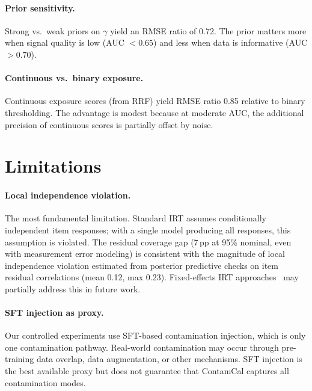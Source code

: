 \documentclass[letterpaper]{article}
\begin{document}
\paragraph{Prior sensitivity.}
Strong vs.\ weak priors on $\gamma$ yield an RMSE ratio of 0.72.
The prior matters more when signal quality is low (AUC $< 0.65$) and less when data is informative (AUC $> 0.70$).

\paragraph{Continuous vs.\ binary exposure.}
Continuous exposure scores (from RRF) yield RMSE ratio 0.85 relative to binary thresholding.
The advantage is modest because at moderate AUC, the additional precision of continuous scores is partially offset by noise.

\section{Limitations}
\label{sec:limitations}

\paragraph{Local independence violation.}
The most fundamental limitation.
Standard IRT assumes conditionally independent item responses; with a single model producing all responses, this assumption is violated.
The residual coverage gap (7\,pp at 95\% nominal, even with measurement error modeling) is consistent with the magnitude of local independence violation estimated from posterior predictive checks on item residual correlations (mean 0.12, max 0.23).
Fixed-effects IRT approaches~\citep{mislevy1986recent} may partially address this in future work.

\paragraph{SFT injection as proxy.}
Our controlled experiments use SFT-based contamination injection, which is only one contamination pathway.
Real-world contamination may occur through pre-training data overlap, data augmentation, or other mechanisms.
SFT injection is the best available proxy but does not guarantee that ContamCal captures all contamination modes.
\end{document}
